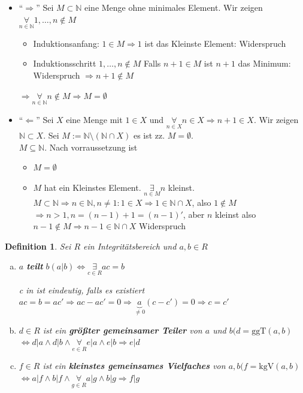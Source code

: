 \documentclass{article}
\newtheorem{defi}[thm]{Definition}
\newcommand{\N}{\mathbb{N}}
\newcommand{\ggT}{\text{ggT}}
\newcommand{\kgV}{\text{kgV}}
\begin{document}
\begin{itemize}
    \item ``$\Rightarrow$''
        Sei $M\subset\N$ eine Menge ohne minimales Element.
        Wir zeigen $\underset{n\in\N}\forall
        1,\hdots,n\notin M$
        \begin{itemize}
            \item Induktionsanfang:
                $1\in M\Rightarrow 1$ ist das Kleinste
                Element: Widerspruch
            \item Induktionsschritt
                $1,\hdots,n\notin M$
                Falls $n+1\in M$ ist $n+1$ das
                Minimum: Widerspruch
                $\Rightarrow n+1\notin M$
        \end{itemize}
        $\Rightarrow \underset{n\in\N}\forall n\notin M
        \Rightarrow M=\emptyset$
    \item ``$\Leftarrow$''
        Sei $X$ eine Menge mit $1\in X$ und
        $\underset{n\in X}\forall n\in X\Rightarrow n+1
        \in X$. Wir zeigen $\N\subset X$.
        Sei $M:=\N\setminus(\N\cap X)$ es ist zz.
        $M=\emptyset$.\\
        $M\subseteq \N$. Nach vorraussetzung ist
        \begin{itemize}
            \item
                $M=\emptyset$
            \item
                $M$ hat ein Kleinstes Element.
                $\underset{n\in M}\exists n$ kleinst.
                $M\subset\N\Rightarrow n\in\N,n\neq 1:
                1\in X\Rightarrow 1\in\N\cap X$, also $1\notin M$
                $\Rightarrow n>1,n=(n-1)+1=(n-1)'$, aber
                $n$ kleinst also $n-1\notin M\Rightarrow
                n-1\in\N\cap X$ Widerspruch
        \end{itemize}
\end{itemize}
\color{black}
\begin{defi}
    Sei $R$ ein Integritätsbereich und $a,b\in R$
    \begin{enumerate}[(a)]
        \item
            $a$ \textbf{teilt} $b(a|b)\Leftrightarrow
            \underset{c\in R}\exists ac=b$

            \color{blue}
            c in ist eindeutig, falls es existiert
            $ac=b=ac'\Rightarrow ac-ac'=0
            \Rightarrow \underbrace{a}_{\neq 0}(c-c')=0
            \Rightarrow c=c'$
            \color{black}
        \item
            $d\in R$ ist ein \textbf{größter gemeinsamer
            Teiler} von $a$ und $b(d=\ggT(a,b)$\\
            $\Leftrightarrow d|a\land d|b\land
            \underset{e\in R}\forall e|a\land e|b
            \Rightarrow e|d$
        \item
            $f\in R$ ist ein \textbf{kleinstes gemeinsames
            Vielfaches} von $a,b (f=\kgV(a,b)$\\
            $\Leftrightarrow a|f\land b|f\land
            \underset{g\in R}\forall a|g\land b|g
            \Rightarrow f|g$
    \end{enumerate}
\end{defi}
\end{document}
